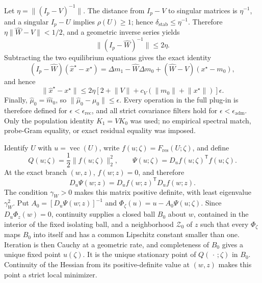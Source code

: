 Let \(\eta=\lVert(I_p-V)^{-1}\rVert\).  The distance from \(I_p-V\) to singular matrices is \(\eta^{-1}\), and a singular \(I_p-U\) implies \(\rho(U)\geq1\); hence \(\delta_{\mathrm{stab}}\leq\eta^{-1}\).  Therefore \(\eta\lVert\widehat W-V\rVert<1/2\), and a geometric inverse series yields
\[
 \lVert(I_p-\widehat W)^{-1}\rVert\leq2\eta.
\]
Subtracting the two equilibrium equations gives the exact identity
\[
 (I_p-\widehat W)(\widehat x^\star-x^\star)
 =\Delta m_1-\widehat W\Delta m_0+(\widehat W-V)(x^\star-m_0),
\]
and hence
\[
 \lVert\widehat x^\star-x^\star\rVert
 \leq2\eta[2+\lVert V\rVert+c_V(\lVert m_0\rVert+\lVert x^\star\rVert)]\epsilon.
\]
Finally, \(\widehat\mu_0=\widehat m_0\), so \(\lVert\widehat\mu_0-\mu_0\rVert\leq\epsilon\).  Every operation in the full plug-in is therefore defined for \(\epsilon<\epsilon_{\mathrm{rec}}\), and all strict covariance filters hold for \(\epsilon<\epsilon_{\mathrm{adm}}\).  Only the population identity \(K_1=VK_0\) was used; no empirical spectral match, probe-Gram equality, or exact residual equality was imposed.

Identify \(U\) with \(u=\operatorname{vec}(U)\), write \(f(u;\zeta)=F_{\mathrm{res}}(U;\zeta)\), and define
\[
 Q(u;\zeta)=\frac12\lVert f(u;\zeta)\rVert_2^2,
 \qquad \Psi(u;\zeta)=D_uf(u;\zeta)^{\mathsf T}f(u;\zeta).
\]
At the exact branch \((w,z)\), \(f(w;z)=0\), and therefore
\[
 D_u\Psi(w;z)=D_uf(w;z)^{\mathsf T}D_uf(w;z).
\]
The condition \(\gamma_W>0\) makes this matrix positive definite, with least eigenvalue \(\gamma_W^2\).  Put \(A_0=[D_u\Psi(w;z)]^{-1}\) and \(\Phi_\zeta(u)=u-A_0\Psi(u;\zeta)\).  Since \(D_u\Phi_z(w)=0\), continuity supplies a closed ball \(B_0\) about \(w\), contained in the interior of the fixed isolating ball, and a neighborhood \(\mathcal Z_0\) of \(z\) such that every \(\Phi_\zeta\) maps \(B_0\) into itself and has a common Lipschitz constant smaller than one.  Iteration is then Cauchy at a geometric rate, and completeness of \(B_0\) gives a unique fixed point \(u(\zeta)\).  It is the unique stationary point of \(Q(\,\cdot\,;\zeta)\) in \(B_0\).  Continuity of the Hessian from its positive-definite value at \((w,z)\) makes this point a strict local minimizer.

